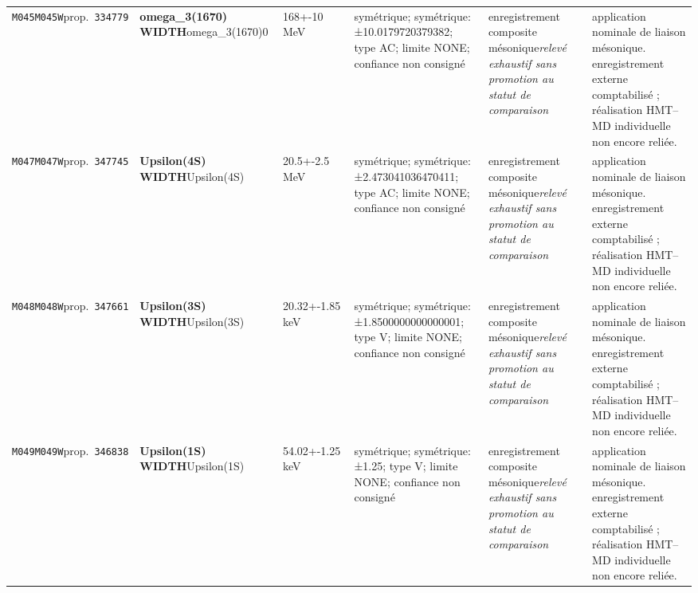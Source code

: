 \begin{landscape}
\begin{longtable}{L{1.85cm}L{4.45cm}L{2.35cm}L{4.05cm}L{3.35cm}L{7.15cm}}
\texttt{M045}\newline \texttt{M045W}\newline prop.\ \texttt{334779} & \textbf{omega\_\allowbreak{}3(1670) WIDTH}\newline omega\_\allowbreak{}3(1670)0 & 168+-10\,MeV & symétrique; symétrique: ±10.0179720379382; type AC; limite NONE; confiance non consigné & enregistrement composite mésonique\newline \emph{relevé exhaustif sans promotion au statut de comparaison} & application nominale de liaison mésonique. enregistrement externe comptabilisé ; réalisation HMT--MD individuelle non encore reliée. \\
\texttt{M047}\newline \texttt{M047W}\newline prop.\ \texttt{347745} & \textbf{Upsilon(4S) WIDTH}\newline Upsilon(4S) & 20.5+-2.5\,MeV & symétrique; symétrique: ±2.473041036470411; type AC; limite NONE; confiance non consigné & enregistrement composite mésonique\newline \emph{relevé exhaustif sans promotion au statut de comparaison} & application nominale de liaison mésonique. enregistrement externe comptabilisé ; réalisation HMT--MD individuelle non encore reliée. \\
\texttt{M048}\newline \texttt{M048W}\newline prop.\ \texttt{347661} & \textbf{Upsilon(3S) WIDTH}\newline Upsilon(3S) & 20.32+-1.85\,keV & symétrique; symétrique: ±1.8500000000000001; type V; limite NONE; confiance non consigné & enregistrement composite mésonique\newline \emph{relevé exhaustif sans promotion au statut de comparaison} & application nominale de liaison mésonique. enregistrement externe comptabilisé ; réalisation HMT--MD individuelle non encore reliée. \\
\texttt{M049}\newline \texttt{M049W}\newline prop.\ \texttt{346838} & \textbf{Upsilon(1S) WIDTH}\newline Upsilon(1S) & 54.02+-1.25\,keV & symétrique; symétrique: ±1.25; type V; limite NONE; confiance non consigné & enregistrement composite mésonique\newline \emph{relevé exhaustif sans promotion au statut de comparaison} & application nominale de liaison mésonique. enregistrement externe comptabilisé ; réalisation HMT--MD individuelle non encore reliée. \\

\end{longtable}
\end{landscape}
